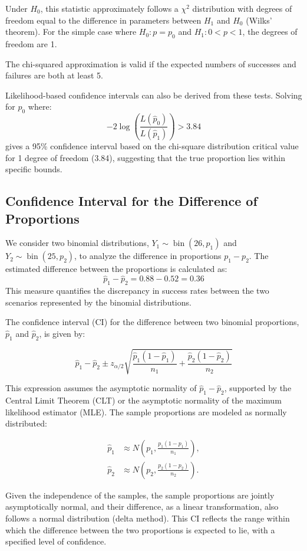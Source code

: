 \documentclass{article}
\begin{document}
Under $H_0$, this statistic approximately follows a $\chi^2$ distribution with degrees of freedom equal to the difference in parameters between $H_1$ and $H_0$ (Wilks' theorem). For the simple case where $H_0: p = p_0$ and $H_1: 0 < p < 1$, the degrees of freedom are 1.

The chi-squared approximation is valid if the expected numbers of successes and failures are both at least 5.

Likelihood-based confidence intervals can also be derived from these tests. Solving for $p_0$ where:
\[
-2 \log \left(\frac{L(\hat{p}_{0})}{L(\hat{p}_{1})}\right) > 3.84
\]
gives a 95\% confidence interval based on the chi-square distribution critical value for 1 degree of freedom (3.84), suggesting that the true proportion lies within specific bounds.

\subsection{Confidence Interval for the Difference of Proportions}

We consider two binomial distributions, \( Y_{1} \sim \operatorname{bin}(26, p_{1}) \) and \( Y_{2} \sim \operatorname{bin}(25, p_{2}) \), to analyze the difference in proportions \( p_{1} - p_{2} \). The estimated difference between the proportions is calculated as:
\[
\hat{p}_{1} - \hat{p}_{2} = 0.88 - 0.52 = 0.36
\]
This measure quantifies the discrepancy in success rates between the two scenarios represented by the binomial distributions.

The confidence interval (CI) for the difference between two binomial proportions, $\hat{p}_{1}$ and $\hat{p}_{2}$, is given by:

\[
\hat{p}_{1} - \hat{p}_{2} \pm z_{\alpha / 2} \sqrt{\frac{\hat{p}_{1}(1-\hat{p}_{1})}{n_{1}} + \frac{\hat{p}_{2}(1-\hat{p}_{2})}{n_{2}}}
\]

This expression assumes the asymptotic normality of $\hat{p}_{1} - \hat{p}_{2}$, supported by the Central Limit Theorem (CLT) or the asymptotic normality of the maximum likelihood estimator (MLE). The sample proportions are modeled as normally distributed:

\[
\begin{aligned}
\hat{p}_{1} &\approx N\left(p_{1}, \frac{p_{1}(1-p_{1})}{n_{1}}\right), \\
\hat{p}_{2} &\approx N\left(p_{2}, \frac{p_{2}(1-p_{2})}{n_{2}}\right).
\end{aligned}
\]

Given the independence of the samples, the sample proportions are jointly asymptotically normal, and their difference, as a linear transformation, also follows a normal distribution (delta method). This CI reflects the range within which the difference between the two proportions is expected to lie, with a specified level of confidence.
\end{document}
